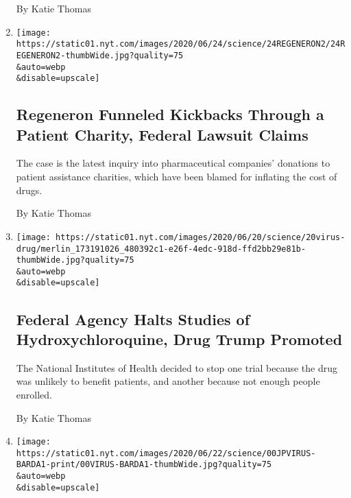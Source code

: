 \begin{enumerate}
  By Katie Thomas
\item
  \href{/2020/06/24/health/drug-kickbacks-regeneron.html}{}

  \texttt{[image: https://static01.nyt.com/images/2020/06/24/science/24REGENERON2/24REGENERON2-thumbWide.jpg?quality=75\\\&auto=webp\\\&disable=upscale]}

  \hypertarget{regeneron-funneled-kickbacks-through-a-patient-charity-federal-lawsuit-claims}{%
  \subsection{Regeneron Funneled Kickbacks Through a Patient Charity,
  Federal Lawsuit
  Claims}\label{regeneron-funneled-kickbacks-through-a-patient-charity-federal-lawsuit-claims}}

  The case is the latest inquiry into pharmaceutical companies'
  donations to patient assistance charities, which have been blamed for
  inflating the cost of drugs.

  By Katie Thomas
\item
  \href{/2020/06/20/health/hydroxychloroquine-coronavirus-trial.html}{}

  \texttt{[image: https://static01.nyt.com/images/2020/06/20/science/20virus-drug/merlin\_173191026\_480392c1-e26f-4edc-918d-ffd2bb29e81b-thumbWide.jpg?quality=75\\\&auto=webp\\\&disable=upscale]}

  \hypertarget{federal-agency-halts-studies-of-hydroxychloroquine-drug-trump-promoted}{%
  \subsection{Federal Agency Halts Studies of Hydroxychloroquine, Drug
  Trump
  Promoted}\label{federal-agency-halts-studies-of-hydroxychloroquine-drug-trump-promoted}}

  The National Institutes of Health decided to stop one trial because
  the drug was unlikely to benefit patients, and another because not
  enough people enrolled.

  By Katie Thomas
\item
  \href{/2020/06/19/health/coronavirus-lung-treatment-funding.html}{}

  \texttt{[image: https://static01.nyt.com/images/2020/06/22/science/00JPVIRUS-BARDA1-print/00VIRUS-BARDA1-thumbWide.jpg?quality=75\\\&auto=webp\\\&disable=upscale]}

  \hypertarget{coronavirus-attacks-the-lungs-a-federal-agency-just-halted-funding-for-new-lung-treatments}{%
}
\end{enumerate}
